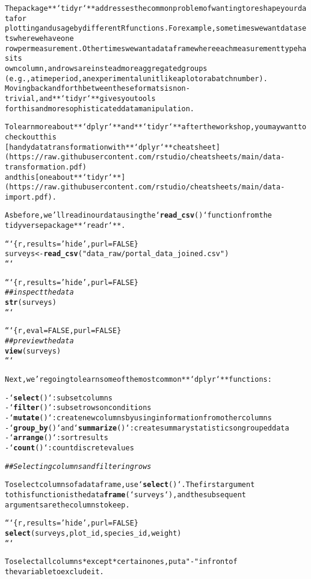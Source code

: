 \documentclass{article}\usepackage[]{graphicx}\usepackage[]{xcolor}
\makeatletter
\newcommand{\hlstr}[1]{\textcolor[rgb]{0.192,0.494,0.8}{#1}}%
\newcommand{\hlcom}[1]{\textcolor[rgb]{0.678,0.584,0.686}{\textit{#1}}}%
\newcommand{\hlkwd}[1]{\textcolor[rgb]{0.737,0.353,0.396}{\textbf{#1}}}%
\newenvironment{kframe}{%
 \def\at@end@of@kframe{}%
 \ifinner\ifhmode%
  \def\at@end@of@kframe{\end{minipage}}%
  \begin{minipage}{\columnwidth}%
 \fi\fi%
 \def\FrameCommand##1{\hskip\@totalleftmargin \hskip-\fboxsep
 \colorbox{shadecolor}{##1}\hskip-\fboxsep
     \hskip-\linewidth \hskip-\@totalleftmargin \hskip\columnwidth}%
 \MakeFramed {\advance\hsize-\width
   \@totalleftmargin\z@ \linewidth\hsize
   \@setminipage}}%
 {\par\unskip\endMakeFramed%
 \at@end@of@kframe}
\newenvironment{knitrout}{}{} %
\makeatother
\begin{document}
\begin{knitrout}
\begin{kframe}
\begin{alltt}
The package **`tidyr`** addresses the common problem of wanting to reshape your data for
plotting and usage by different R functions. For example, sometimes we want data sets where we have one
row per measurement. Other times we want a data frame where each measurement type has its
own column, and rows are instead more aggregated groups
(e.g., a time period, an experimental unit like a plot or a batch number).
Moving back and forth between these formats is non-trivial, and **`tidyr`** gives you tools
for this and more sophisticated  data manipulation.

To learn more about **`dplyr`** and **`tidyr`** after the workshop, you may want to check out this
[handy data transformation with **`dplyr`** cheatsheet](https://raw.githubusercontent.com/rstudio/cheatsheets/main/data-transformation.pdf)
and this [one about **`tidyr`**](https://raw.githubusercontent.com/rstudio/cheatsheets/main/data-import.pdf).

As before, we'll read in our data using the `\hlkwd{read_csv}()` function from the
tidyverse package **`readr`**.


```\{r, results = \hlstr{'hide'}, purl = FALSE\}
surveys <- \hlkwd{read_csv}(\hlstr{"data_raw/portal_data_joined.csv"})
```

```\{r, results = \hlstr{'hide'}, purl = FALSE\}
\hlcom{## inspect the data}
\hlkwd{str}(surveys)
```

```\{r, eval=FALSE, purl=FALSE\}
\hlcom{## preview the data}
\hlkwd{view}(surveys)
```

Next, we're going to learn some of the most common **`dplyr`** functions:

- `\hlkwd{select}()`: subset columns
- `\hlkwd{filter}()`: subset rows on conditions
- `\hlkwd{mutate}()`: create new columns by using information from other columns
- `\hlkwd{group_by}()` and `\hlkwd{summarize}()`: create summary statistics on grouped data
- `\hlkwd{arrange}()`: sort results
- `\hlkwd{count}()`: count discrete values

\hlcom{## Selecting columns and filtering rows}

To select columns of a data frame, use `\hlkwd{select}()`. The first argument
to this function is the data \hlkwd{frame} (`surveys`), and the subsequent
arguments are the columns to keep.

```\{r, results = \hlstr{'hide'}, purl = FALSE\}
\hlkwd{select}(surveys, plot_id, species_id, weight)
```

To select all columns *except* certain ones, put a \hlstr{"-"} in front of
the variable to exclude it.


\end{alltt}
\end{kframe}
\end{knitrout}
\end{document}
